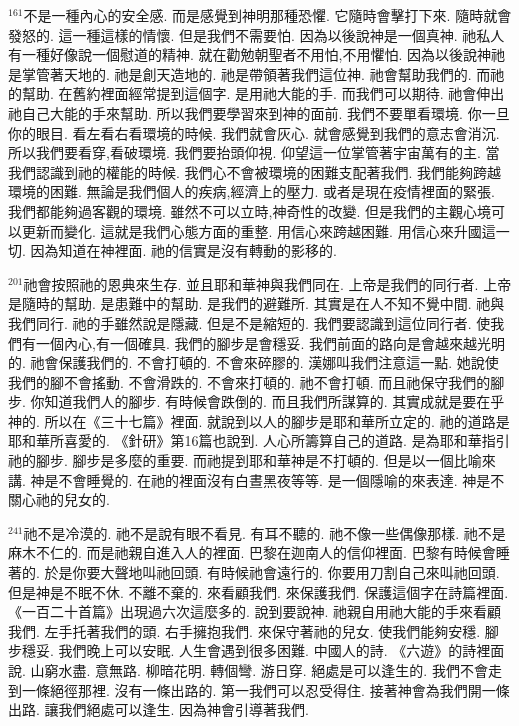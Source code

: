 \documentclass{book}
\begin{document}
$^{161}$不是一種內心的安全感.
而是感覺到神明那種恐懼.
它隨時會擊打下來.
隨時就會發怒的.
這一種這樣的情懷.
但是我們不需要怕.
因為以後說神是一個真神.
祂私人有一種好像說一個慰道的精神.
就在勸勉朝聖者不用怕,不用懼怕.
因為以後說神祂是掌管著天地的.
祂是創天造地的.
祂是帶領著我們這位神.
祂會幫助我們的.
而祂的幫助.
在舊約裡面經常提到這個字.
是用祂大能的手.
而我們可以期待.
祂會伸出祂自己大能的手來幫助.
所以我們要學習來到神的面前.
我們不要單看環境.
你一旦你的眼目.
看左看右看環境的時候.
我們就會灰心.
就會感覺到我們的意志會消沉.
所以我們要看穿,看破環境.
我們要抬頭仰視.
仰望這一位掌管著宇宙萬有的主.
當我們認識到祂的權能的時候.
我們心不會被環境的困難支配著我們.
我們能夠跨越環境的困難.
無論是我們個人的疾病,經濟上的壓力.
或者是現在疫情裡面的緊張.
我們都能夠過客觀的環境.
雖然不可以立時,神奇性的改變.
但是我們的主觀心境可以更新而變化.
這就是我們心態方面的重整.
用信心來跨越困難.
用信心來升國這一切.
因為知道在神裡面.
祂的信實是沒有轉動的影移的.

$^{201}$祂會按照祂的恩典來生存.
並且耶和華神與我們同在.
上帝是我們的同行者.
上帝是隨時的幫助.
是患難中的幫助.
是我們的避難所.
其實是在人不知不覺中間.
祂與我們同行.
祂的手雖然說是隱藏.
但是不是縮短的.
我們要認識到這位同行者.
使我們有一個內心,有一個確具.
我們的腳步是會穩妥.
我們前面的路向是會越來越光明的.
祂會保護我們的.
不會打頓的.
不會來碎膠的.
漢娜叫我們注意這一點.
她說使我們的腳不會搖動.
不會滑跌的.
不會來打頓的.
祂不會打頓.
而且祂保守我們的腳步.
你知道我們人的腳步.
有時候會跌倒的.
而且我們所謀算的.
其實成就是要在乎神的.
所以在《三十七篇》裡面.
就說到以人的腳步是耶和華所立定的.
祂的道路是耶和華所喜愛的.
《針研》第16篇也說到.
人心所籌算自己的道路.
是為耶和華指引祂的腳步.
腳步是多麼的重要.
而祂提到耶和華神是不打頓的.
但是以一個比喻來講.
神是不會睡覺的.
在祂的裡面沒有白晝黑夜等等.
是一個隱喻的來表達.
神是不關心祂的兒女的.

$^{241}$祂不是冷漠的.
祂不是說有眼不看見.
有耳不聽的.
祂不像一些偶像那樣.
祂不是麻木不仁的.
而是祂親自進入人的裡面.
巴黎在迦南人的信仰裡面.
巴黎有時候會睡著的.
於是你要大聲地叫祂回頭.
有時候祂會遠行的.
你要用刀割自己來叫祂回頭.
但是神是不眠不休.
不離不棄的.
來看顧我們.
來保護我們.
保護這個字在詩篇裡面.
《一百二十首篇》出現過六次這麼多的.
說到要說神.
祂親自用祂大能的手來看顧我們.
左手托著我們的頭.
右手擁抱我們.
來保守著祂的兒女.
使我們能夠安穩.
腳步穩妥.
我們晚上可以安眠.
人生會遇到很多困難.
中國人的詩.
《六遊》的詩裡面說.
山窮水盡.
意無路.
柳暗花明.
轉個彎.
游日穿.
絕處是可以逢生的.
我們不會走到一條絕徑那裡.
沒有一條出路的.
第一我們可以忍受得住.
接著神會為我們開一條出路.
讓我們絕處可以逢生.
因為神會引導著我們.
\end{document}
